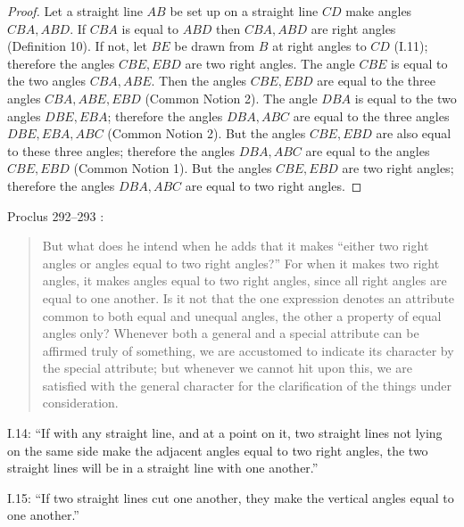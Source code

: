 \documentclass{article}
\begin{document}
\begin{proof}
Let a straight line $AB$ be set up on a straight line $CD$ make angles $CBA,ABD$.
If $CBA$ is equal to $ABD$ then $CBA,ABD$ are right angles (Definition 10).
If not, let $BE$ be drawn from $B$ at right angles to $CD$ (I.11); therefore
the angles $CBE, EBD$ are two right angles. 
The angle $CBE$ is equal to the two angles $CBA,ABE$.
Then the angles $CBE,EBD$ are equal to the three angles $CBA,ABE,EBD$ (Common Notion 2).
The angle $DBA$ is equal to the two angles $DBE,EBA$; therefore
the angles $DBA,ABC$ are equal to the three angles $DBE,EBA,ABC$ (Common Notion 2).
But the angles $CBE,EBD$ are also equal to these three angles; therefore the angles
$DBA,ABC$ are equal to the angles $CBE,EBD$ (Common Notion 1).
But the angles $CBE,EBD$ are two right angles; therefore
the angles $DBA,ABC$ are equal to two right angles.
\end{proof}

Proclus 292--293 \cite[pp.~228--229]{proclus}:

\begin{quote}
But what
does he intend when he adds that it makes ``either two right
angles or angles equal to two right angles?'' For when it
makes two right angles, it makes angles equal to two right
angles, since all right angles are equal to one another. Is it
not that the one expression denotes an attribute common to
both equal and unequal angles, the other a property of
equal angles only? Whenever both a general and a special
attribute can be affirmed truly of something, we are
accustomed to indicate its character by the special attribute;
but whenever we cannot hit upon this, we are satisfied with
the general character for the clarification of the things under consideration.
\end{quote}

I.14: ``If with any straight line, and at a point on it, two straight lines
not lying on the same side make the adjacent angles equal to
two right angles, the two straight lines will be in a straight line with one another.''

I.15: ``If two straight lines cut one another, they make the vertical
angles equal to one another.''
\end{document}

